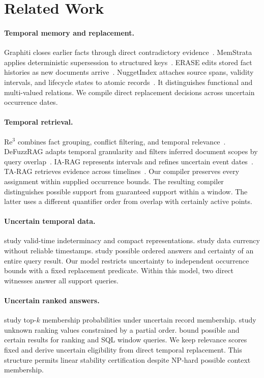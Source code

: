 \section{Related Work}
\label{sec:related}

\paragraph{Temporal memory and replacement.}
Graphiti closes earlier facts through direct contradictory evidence~\citep{rasmussen2025zep,graphiti2026source}.
MemStrata applies deterministic supersession to structured keys~\citep{yadav2026memstrata}.
ERASE edits stored fact histories as new documents arrive~\citep{li2025erase}.
NuggetIndex attaches source spans, validity intervals, and lifecycle states to atomic records~\citep{zerhoudi2026nuggetindex}.
It distinguishes functional and multi-valued relations.
We compile direct replacement decisions across uncertain occurrence dates.

\paragraph{Temporal retrieval.}
Re$^3$ combines fact grouping, conflict filtering, and temporal relevance~\citep{cao2026re3}.
DeFuzzRAG adapts temporal granularity and filters inferred document scopes by query overlap~\citep{chen2026defuzzrag}.
IA-RAG represents intervals and refines uncertain event dates~\citep{wang2026iarag}.
TA-RAG retrieves evidence across timelines~\citep{lau2025tarag}.
Our compiler preserves every assignment within supplied occurrence bounds.
The resulting compiler distinguishes possible support from guaranteed support within a window.
The latter uses a different quantifier order from overlap with certainly active points.

\paragraph{Uncertain temporal data.}
\citet{anselma2013indeterminacy} study valid-time indeterminacy and compact representations.
\citet{fan2012currency} study data currency without reliable timestamps.
\citet{amarilli2017order} study possible ordered answers and certainty of an entire query result.
Our model restricts uncertainty to independent occurrence bounds with a fixed replacement predicate.
Within this model, two direct witnesses answer all support queries.

\paragraph{Uncertain ranked answers.}
\citet{hua2008ranking} study top-$k$ membership probabilities under uncertain record membership.
\citet{amarilli2017topk} study unknown ranking values constrained by a partial order.
\citet{feng2023ranking} bound possible and certain results for ranking and SQL window queries.
We keep relevance scores fixed and derive uncertain eligibility from direct temporal replacement.
This structure permits linear stability certification despite NP-hard possible context membership.

